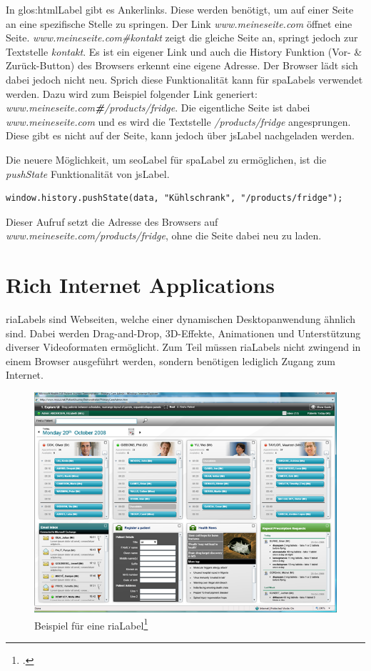 In \Gls{glos:htmlLabel} gibt es Ankerlinks. Diese werden benötigt, um auf einer Seite an eine spezifische Stelle zu springen. Der Link \textit{www.meineseite.com} öffnet eine Seite. \textit{www.meineseite.com\#kontakt} zeigt die gleiche Seite an, springt jedoch zur Textstelle \textit{kontakt}. Es ist ein eigener Link und auch die History Funktion (Vor- \& Zurück-Button) des Browsers erkennt eine eigene Adresse. Der Browser lädt sich dabei jedoch nicht neu. Sprich diese Funktionalität kann für \glspl{spaLabel} verwendet werden. Dazu wird zum Beispiel folgender Link generiert: \textit{www.meineseite.com\textbf{\#}/products/fridge}. Die eigentliche Seite ist dabei \textit{www.meineseite.com} und es wird die Textstelle \textit{/products/fridge} angesprungen. Diese gibt es nicht auf der Seite, kann jedoch über \gls{jsLabel} nachgeladen werden.

Die neuere Möglichkeit, um \gls{seoLabel} für \gls{spaLabel} zu ermöglichen, ist die \textit{pushState} Funktionalität von \gls{jsLabel}.

\begin{lstlisting}
window.history.pushState(data, "Kühlschrank", "/products/fridge");
\end{lstlisting}

Dieser Aufruf setzt die Adresse des Browsers auf \textit{www.meineseite.com/products/fridge}, ohne die Seite dabei neu zu laden.

\section{Rich Internet Applications}
\glspl{riaLabel} sind Webseiten, welche einer dynamischen Desktopanwendung ähnlich sind. Dabei werden Drag-and-Drop, 3D-Effekte, Animationen und Unterstützung diverser Videoformaten ermöglicht. Zum Teil müssen \glspl{riaLabel} nicht zwingend in einem Browser ausgeführt werden, sondern benötigen lediglich Zugang zum Internet.

\begin{figure}[H]
	\centering
	\includegraphics[width=.6\linewidth]{images/rich_internet_application.png}
	\caption{Beispiel für eine \gls{riaLabel}\footcite{AjaxWorld_Talk_Building_Rich_Internet_Applications_2015-06-07}}
	\label{fig:softwaredesign:richinternetapplication}
\end{figure}

